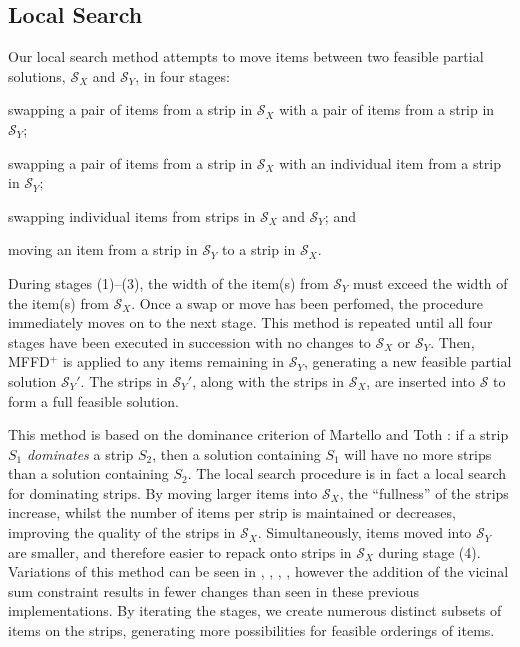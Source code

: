 \documentclass{elsarticle}
\begin{document}
\subsection{Local Search}
\label{sub:localsearch}
Our local search method attempts to move items between two feasible partial solutions, $\mathcal{S}_X$ and $\mathcal{S}_Y$, in four stages: \begin{enumerate*}[label={(\arabic*)}]
	\item swapping a pair of items from a strip in $\mathcal{S}_X$ with a pair of items from a strip in $\mathcal{S}_Y$;
	\item swapping a pair of items from a strip in $\mathcal{S}_X$ with an individual item from a strip in $\mathcal{S}_Y$;
	\item swapping individual items from strips in $\mathcal{S}_X$ and $\mathcal{S}_Y$; and
	\item moving an item from a strip in $\mathcal{S}_Y$ to a strip in $\mathcal{S}_X$.
\end{enumerate*} 
During stages (1)--(3), the width of the item(s) from $\mathcal{S}_Y$ must exceed the width of the item(s) from $\mathcal{S}_X$. Once a swap or move has been perfomed, the procedure immediately moves on to the next stage. This method is repeated until all four stages have been executed in succession with no changes to $\mathcal{S}_X$ or $\mathcal{S}_Y$. Then, MFFD$^+$ is applied to any items remaining in $\mathcal{S}_Y$, generating a new feasible partial solution $\mathcal{S}_Y'$. The strips in $\mathcal{S}_Y'$, along with the strips in $\mathcal{S}_X$, are inserted into $\mathcal{S}$ to form a full feasible solution.

This method is based on the dominance criterion of Martello and Toth \cite{martello1990l}: if a strip $S_1$ \emph{dominates} a strip $S_2$, then a solution containing $S_1$ will have no more strips than a solution containing $S_2$. The local search procedure is in fact a local search for dominating strips. By moving larger items into $\mathcal{S}_X$, the ``fullness'' of the strips increase, whilst the number of items per strip is maintained or decreases, improving the quality of the strips in $\mathcal{S}_X$. Simultaneously, items moved into $\mathcal{S}_Y$ are smaller, and therefore easier to repack onto strips in $\mathcal{S}_X$ during stage (4). Variations of this method can be seen in \cite{falkenauer1996}, \cite{levine2004}, \cite{lewis2009}, \cite{lewis2017}, however the addition of the vicinal sum constraint results in fewer changes than seen in these previous implementations. By iterating the stages, we create numerous distinct subsets of items on the strips, generating more possibilities for feasible orderings of items.
\end{document}

